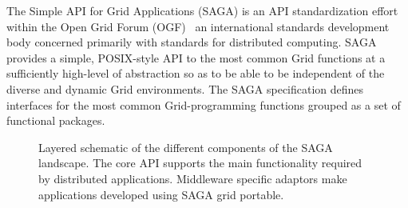 \documentclass{llncs}
\begin{document}
\up

The Simple API for Grid Applications (SAGA) is an API standardization
effort within the Open Grid Forum (OGF)~\cite{ogf_web} an
international standards development body concerned primarily with
standards for distributed computing.  SAGA provides a simple,
POSIX-style API to the most common Grid functions at a sufficiently
high-level of abstraction so as to be able to be independent of the
diverse and dynamic Grid environments.  The SAGA specification defines
interfaces for the most common Grid-programming functions grouped as a
set of functional packages.  
\up
\begin{figure}[!h]
  \begin{center}
  \end{center}
  \caption{Layered schematic of the different components of the SAGA
    landscape. The core API supports the main functionality required
    by distributed applications.  Middleware specific adaptors make
    applications developed using SAGA grid portable. \up}
 \label{sagalayer}
\end{figure}

\end{document}
